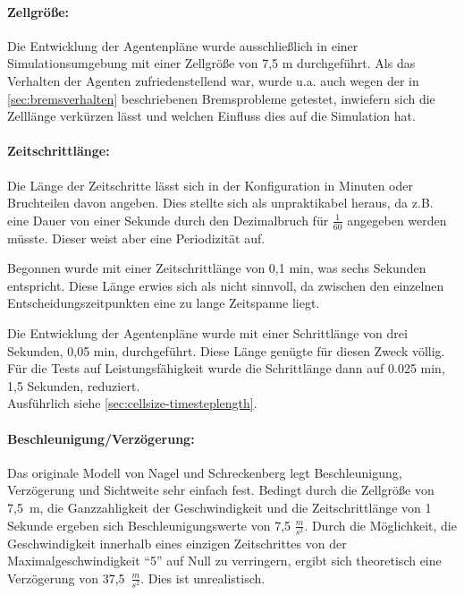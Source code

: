 \paragraph*{Zellgröße:}
\label{zellgroesse-zeitschritte}
Die Entwicklung der Agentenpläne wurde ausschließlich in einer Simulationsumgebung mit einer Zellgröße von 7,5 m durchgeführt.
Als das Verhalten der Agenten zufriedenstellend war, wurde u.a. auch wegen der in \cref{sec:bremsverhalten} beschriebenen Bremsprobleme getestet, inwiefern sich die Zelllänge verkürzen lässt und welchen Einfluss dies auf die Simulation hat.


\paragraph*{Zeitschrittlänge:}
Die Länge der Zeitschritte lässt sich in der Konfiguration in Minuten oder Bruchteilen davon angeben. 
Dies stellte sich als unpraktikabel heraus, da z.B. eine Dauer von einer Sekunde durch den Dezimalbruch für $\frac{1}{60}$ angegeben werden müsste. Dieser weist aber eine Periodizität auf.

Begonnen wurde mit einer Zeitschrittlänge von 0,1 min, was sechs Sekunden entspricht. 
Diese Länge erwies sich als nicht sinnvoll, da zwischen den einzelnen Entscheidungszeitpunkten eine zu lange Zeitspanne liegt.

Die Entwicklung der Agentenpläne wurde mit einer Schrittlänge von drei Sekunden, 0,05 min, durchgeführt. Diese Länge genügte für diesen Zweck völlig.
Für die Tests auf Leistungsfähigkeit wurde die Schrittlänge dann auf 0.025 min, 1,5 Sekunden, reduziert.
\\
Ausführlich siehe \cref{sec:cellsize-timesteplength}.

\paragraph*{Beschleunigung/Verzögerung:}
\label{beschl-verz}
Das originale Modell von Nagel und Schreckenberg legt Beschleunigung, Verzögerung und Sichtweite sehr einfach fest.
Bedingt durch die Zellgröße von \mbox{7,5 m}, die Ganzzahligkeit der Geschwindigkeit und die Zeitschrittlänge von 1 Sekunde ergeben sich Beschleunigungswerte von 7,5 $\frac{m}{s^{2}}$. 
Durch die Möglichkeit, die Geschwindigkeit innerhalb eines einzigen Zeitschrittes von der Maximalgeschwindigkeit \enquote{5} auf Null zu verringern, ergibt sich theoretisch eine Verzögerung von \mbox{37,5 $\frac{m}{s^{2}}$}.
Dies ist unrealistisch.

